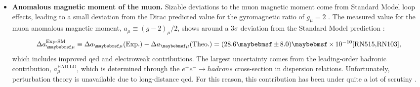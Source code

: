 \begin{itemize}
\item \textbf{Anomalous magnetic moment of the muon.} Sizable deviations to the muon magnetic moment come from Standard Model loop effects, leading to a small deviation from the Dirac predicted value for the gyromagnetic ratio of $g_{\mu}=2$ \cite{RN95,RN98,RN101,RN99}. The measured value for the muon anomalous magnetic moment, $a_{\mu} \equiv (g-2)_{\mu}/2$, shows around a $3\sigma$ deviation from the Standard Model prediction \cite{RN627}:
\begin{equation}
\Delta a^{\text{Exp-SM}}_{\mu}\equiv \Delta a_{\mu}(\text{Exp.})-\Delta a_{\mu}(\text{Theo.})=(28.6 \pm 8.0)\times 10^{-10} \text{\cite{RN515,RN103}},
\label{eqn:amuExpSM}
\end{equation}
which includes improved \acrshort{qed} \cite{RN105, RN625} and electroweak \cite{RN106} contributions. The largest uncertainty comes from the leading-order hadronic contribution, $a_{\mu}^{\text{HAD,LO}}$, which is determined through the $e^{+} e^{-} \rightarrow hadrons$ cross-section in dispersion relations. Unfortunately, perturbation theory is unavailable due to long-distance \acrshort{qcd}. For this reason, this contribution has been under quite a lot of scrutiny \cite{RN627,RN628,RN101,RN630,RN631,RN632,RN633,RN634}. 
\begin{center}
\end{center}
\end{itemize}
